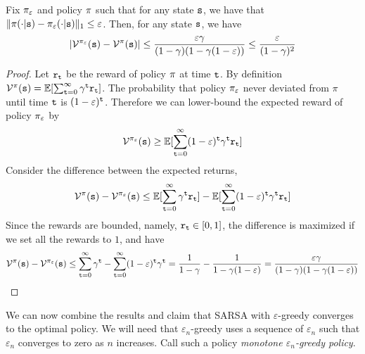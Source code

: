 \begin{lemma}
\label{lemma:epsilon-greedy}
%
Fix $\pi_\varepsilon$ and policy $\pi$ such that for any
state ${\tt s}$, we have that
$\|\pi(\cdot|{\tt s})-\pi_\varepsilon(\cdot|{\tt s})\|_1\leq\varepsilon$.
Then, for any state ${\tt s}$, we have
\[
|\mathcal{V}^{\pi_\varepsilon}({\tt s})-\mathcal{V}^\pi({\tt s})|\leq
\frac{\varepsilon\gamma}{(1-\gamma)(1-\gamma(1-\varepsilon))}\leq \frac{\varepsilon}{(1-\gamma)^2}
\]
\end{lemma}

\begin{proof}
Let ${\tt r}_{\tt t}$ be the reward of policy $\pi$ at time
${\tt t}$. By definition
$\mathcal{V}^\pi({\tt s})=\mathbb{E}[\sum_{{\tt t}=0}^\infty
\gamma^{\tt t}{\tt r}_{\tt t}]$. The probability that policy
$\pi_\varepsilon$ never deviated from $\pi$ until time ${\tt t}$
is $(1-\varepsilon)^{\tt t}$. Therefore we can lower-bound the expected reward of policy $\pi_\varepsilon$ by
\[\mathcal{V}^{\pi_\varepsilon}({\tt s})\geq \mathbb{E}[\sum_{{\tt t}=0}^\infty
(1-\varepsilon)^{\tt t}\gamma^{\tt t}{\tt r}_{\tt t}]\]
Consider the difference between the expected returns,
\[\mathcal{V}^\pi({\tt s})- \mathcal{V}^{\pi_\varepsilon}({\tt s}) \leq
\mathbb{E}[\sum_{{\tt t}=0}^\infty \gamma^{\tt t}{\tt r}_{\tt t}] -
\mathbb{E}[\sum_{{\tt t}=0}^\infty
(1-\varepsilon)^{\tt t}\gamma^{\tt t}{\tt r}_{\tt t}] \]
Since the rewards are bounded, namely, ${\tt r}_{\tt t}\in[0,1]$, the
difference is maximized if we set all the rewards to $1$, and have
\[
\mathcal{V}^\pi({\tt s})- \mathcal{V}^{\pi_\varepsilon}({\tt s}) \leq
\sum_{{\tt t}=0}^\infty \gamma^{\tt t} - \sum_{{\tt t}=0}^\infty
(1-\varepsilon)^{\tt t}\gamma^{\tt t}=
\frac{1}{1-\gamma}-\frac{1}{1-\gamma(1-\varepsilon)}=\frac{\varepsilon\gamma}{(1-\gamma)(1-\gamma(1-\varepsilon))}
\]
\end{proof}

We can now combine the results and claim that SARSA with
$\varepsilon$-greedy converges to the optimal policy. We will need
that $\varepsilon_n$-greedy uses a sequence of $\varepsilon_n$ such
that $\varepsilon_n$ converges to zero as $n$ increases. Call such a
policy \emph{monotone $\varepsilon_n$-greedy policy}.

